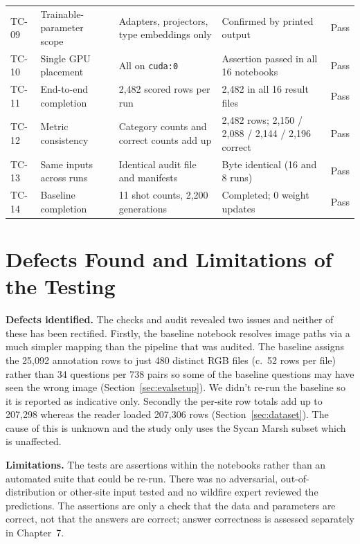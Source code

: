 \documentclass[12pt]{report}
\begin{document}
{\begin{longtable}{P{0.4in}P{1.4in}P{1.4in}P{1.5in}P{0.4in}}
TC-09 & Trainable-parameter scope & Adapters, projectors, type embeddings only & Confirmed by printed output & Pass \\
TC-10 & Single GPU placement & All on \texttt{cuda:0} & Assertion passed in all 16 notebooks & Pass \\
TC-11 & End-to-end completion & 2,482 scored rows per run & 2,482 in all 16 result files & Pass \\
TC-12 & Metric consistency & Category counts and correct counts add up & 2,482 rows; 2,150 / 2,088 / 2,144 / 2,196 correct & Pass \\
TC-13 & Same inputs across runs & Identical audit file and manifests & Byte identical (16 and 8 runs) & Pass \\
TC-14 & Baseline completion & 11 shot counts, 2,200 generations & Completed; 0 weight updates & Pass \\
\end{longtable}}

\section{Defects Found and Limitations of the Testing}
\textbf{Defects identified.} The checks and audit revealed two issues and neither of these has been rectified. Firstly, the baseline notebook resolves image paths via a much simpler mapping than the pipeline that was audited. The baseline assigns the 25,092 annotation rows to just 480 distinct RGB files (c.\ 52 rows per file) rather than 34 questions per 738 pairs so some of the baseline questions may have seen the wrong image (Section~\ref{sec:evalsetup}). We didn't re-run the baseline so it is reported as indicative only. Secondly the per-site row totals add up to 207,298 whereas the reader loaded 207,306 rows (Section~\ref{sec:dataset}). The cause of this is unknown and the study only uses the Sycan Marsh subset which is unaffected.

\textbf{Limitations.} The tests are assertions within the notebooks rather than an automated suite that could be re-run. There was no adversarial, out-of-distribution or other-site input tested and no wildfire expert reviewed the predictions. The assertions are only a check that the data and parameters are correct, not that the answers are correct; answer correctness is assessed separately in Chapter~7.
\clearpage 
\end{document}
